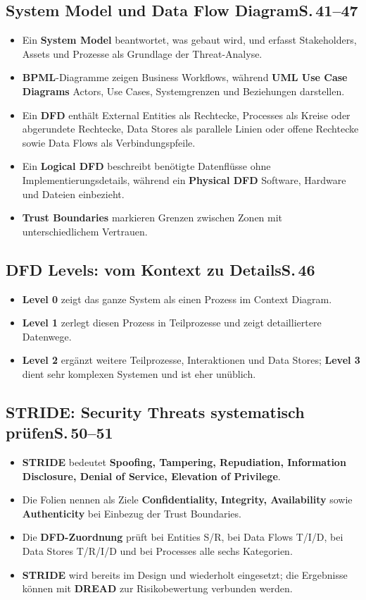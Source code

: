 \documentclass[11pt,a4paper]{article}
\newcommand{\block}[2]{\subsection*{#1\hfill{\normalfont\small #2}}}
\begin{document}
\newpage
\block{System Model und Data Flow Diagram}{S.\,41--47}
\begin{itemize}
\item Ein \textbf{System Model} beantwortet, was gebaut wird, und erfasst Stakeholders, Assets und Prozesse als Grundlage der Threat-Analyse.
\item \textbf{BPML}-Diagramme zeigen Business Workflows, während \textbf{UML Use Case Diagrams} Actors, Use Cases, Systemgrenzen und Beziehungen darstellen.
\item Ein \textbf{DFD} enthält External Entities als Rechtecke, Processes als Kreise oder abgerundete Rechtecke, Data Stores als parallele Linien oder offene Rechtecke sowie Data Flows als Verbindungspfeile.
\item Ein \textbf{Logical DFD} beschreibt benötigte Datenflüsse ohne Implementierungsdetails, während ein \textbf{Physical DFD} Software, Hardware und Dateien einbezieht.
\item \textbf{Trust Boundaries} markieren Grenzen zwischen Zonen mit unterschiedlichem Vertrauen.
\end{itemize}

\block{DFD Levels: vom Kontext zu Details}{S.\,46}
\begin{itemize}
\item \textbf{Level 0} zeigt das ganze System als einen Prozess im Context Diagram.
\item \textbf{Level 1} zerlegt diesen Prozess in Teilprozesse und zeigt detailliertere Datenwege.
\item \textbf{Level 2} ergänzt weitere Teilprozesse, Interaktionen und Data Stores; \textbf{Level 3} dient sehr komplexen Systemen und ist eher unüblich.
\end{itemize}

\block{STRIDE: Security Threats systematisch prüfen}{S.\,50--51}
\begin{itemize}
\item \textbf{STRIDE} bedeutet \textbf{Spoofing, Tampering, Repudiation, Information Disclosure, Denial of Service, Elevation of Privilege}.
\item Die Folien nennen als Ziele \textbf{Confidentiality, Integrity, Availability} sowie \textbf{Authenticity} bei Einbezug der Trust Boundaries.
\item Die \textbf{DFD-Zuordnung} prüft bei Entities S/R, bei Data Flows T/I/D, bei Data Stores T/R/I/D und bei Processes alle sechs Kategorien.
\item \textbf{STRIDE} wird bereits im Design und wiederholt eingesetzt; die Ergebnisse können mit \textbf{DREAD} zur Risikobewertung verbunden werden.
\end{itemize}
\end{document}
